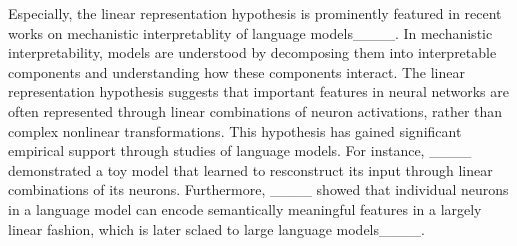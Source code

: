Especially, the linear representation hypothesis is prominently featured in recent works on mechanistic interpretablity of language models____. In mechanistic interpretability, models are understood by decomposing them into interpretable components and understanding how these components interact. The linear representation hypothesis suggests that important features in neural networks are often represented through linear combinations of neuron activations, rather than complex nonlinear transformations.
This hypothesis has gained significant empirical support through studies of language models. For instance, ____ demonstrated a toy model that learned to resconstruct its input through linear combinations of its neurons. Furthermore, ____ showed that individual neurons in a language model can encode semantically meaningful features in a largely linear fashion, which is later sclaed to large language models____.